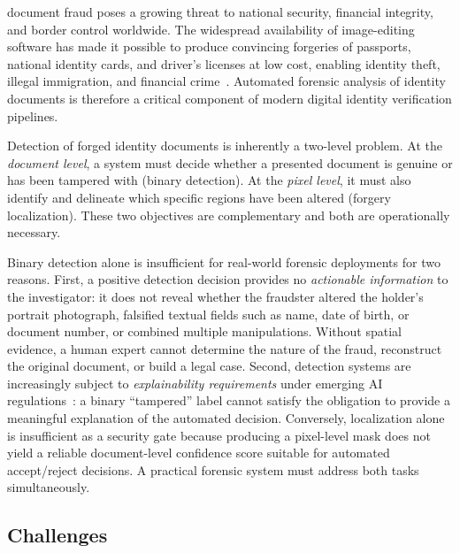 
 document fraud poses a growing threat to national security,
financial integrity, and border control worldwide. The widespread availability of
image-editing software has made it possible to produce convincing forgeries of
passports, national identity cards, and driver's licenses at low cost, enabling
identity theft, illegal immigration, and financial crime~\cite{europol2022deepfakes}.
Automated forensic analysis of identity documents is therefore a critical component
of modern digital identity verification pipelines.

Detection of forged identity documents is inherently a two-level problem. At the
\emph{document level}, a system must decide whether a presented document is genuine
or has been tampered with (binary detection). At the \emph{pixel level}, it must
also identify and delineate which specific regions have been altered (forgery
localization). These two objectives are complementary and both are operationally
necessary.

Binary detection alone is insufficient for real-world forensic deployments for two
reasons. First, a positive detection decision provides no \emph{actionable
information} to the investigator: it does not reveal whether the fraudster altered
the holder's portrait photograph, falsified textual fields such as name, date of
birth, or document number, or combined multiple manipulations. Without spatial
evidence, a human expert cannot determine the nature of the fraud, reconstruct
the original document, or build a legal case. Second, detection systems are
increasingly subject to \emph{explainability requirements} under emerging AI
regulations~\cite{euaiact2024}: a binary ``tampered'' label cannot satisfy the
obligation to provide a meaningful explanation of the automated decision.
Conversely, localization alone is insufficient as a security gate because
producing a pixel-level mask does not yield a reliable document-level confidence
score suitable for automated accept/reject decisions. A practical forensic
system must address both tasks simultaneously.

\subsection*{Challenges}

